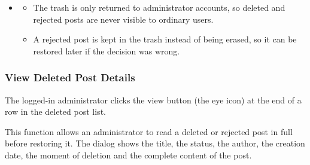 \begin{itemize}[leftmargin=1.6em,topsep=4pt,itemsep=3pt,parsep=0pt,label=$\bullet$]
\begin{itemize}[leftmargin=2.2em,topsep=2pt,itemsep=3pt,parsep=0pt,label=$\circ$]
        \end{itemize}
    \item {}
        \begin{itemize}[leftmargin=2.2em,topsep=2pt,itemsep=3pt,parsep=0pt,label=$\circ$]
            \item The trash is only returned to administrator accounts, so deleted and rejected posts are never visible to ordinary users.
            \item A rejected post is kept in the trash instead of being erased, so it can be restored later if the decision was wrong.
        \end{itemize}
\end{itemize}


\subsubsection{View Deleted Post Details}

 The logged-in administrator clicks the view button (the eye icon) at the end of a row in the deleted post list.

 This function allows an administrator to read a deleted or rejected post in full before restoring it. The dialog shows the title, the status, the author, the creation date, the moment of deletion and the complete content of the post.


